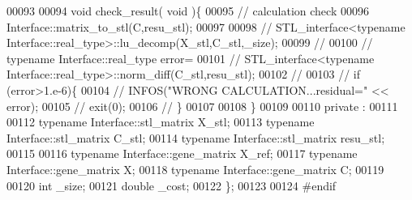\begin{DoxyCode}
00093 
00094   \textcolor{keywordtype}{void} check\_result( \textcolor{keywordtype}{void} )\{
00095     \textcolor{comment}{// calculation check}
00096     Interface::matrix\_to\_stl(C,resu\_stl);
00097 
00098 \textcolor{comment}{//     STL\_interface<typename Interface::real\_type>::lu\_decomp(X\_stl,C\_stl,\_size);}
00099 \textcolor{comment}{//}
00100 \textcolor{comment}{//     typename Interface::real\_type error=}
00101 \textcolor{comment}{//       STL\_interface<typename Interface::real\_type>::norm\_diff(C\_stl,resu\_stl);}
00102 \textcolor{comment}{//}
00103 \textcolor{comment}{//     if (error>1.e-6)\{}
00104 \textcolor{comment}{//       INFOS("WRONG CALCULATION...residual=" << error);}
00105 \textcolor{comment}{//       exit(0);}
00106 \textcolor{comment}{//     \}}
00107 
00108   \}
00109 
00110 private :
00111 
00112   \textcolor{keyword}{typename} Interface::stl\_matrix X\_stl;
00113   \textcolor{keyword}{typename} Interface::stl\_matrix C\_stl;
00114   \textcolor{keyword}{typename} Interface::stl\_matrix resu\_stl;
00115 
00116   \textcolor{keyword}{typename} Interface::gene\_matrix X\_ref;
00117   \textcolor{keyword}{typename} Interface::gene\_matrix X;
00118   \textcolor{keyword}{typename} Interface::gene\_matrix C;
00119 
00120   \textcolor{keywordtype}{int} \_size;
00121   \textcolor{keywordtype}{double} \_cost;
00122 \};
00123 
00124 \textcolor{preprocessor}{#endif}
\end{DoxyCode}
